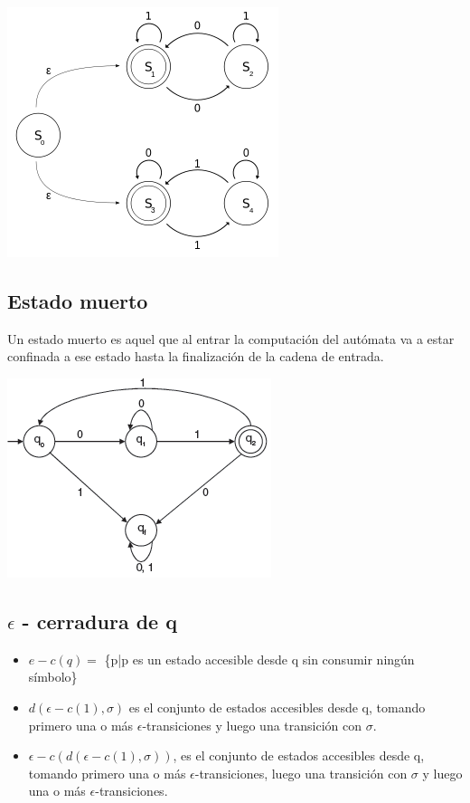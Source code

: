 \documentclass[a4paper,9pt]{extarticle}
\newenvironment{Figure}
  {\par\medskip\noindent\minipage{\linewidth}}
  {\endminipage\par\medskip}
\begin{document}
\begin{multicols*}{2}
\begin{Figure}
 \centering
 \includegraphics[scale=0.5]{AFNE}
\end{Figure}

\subsection{Estado muerto}
Un estado muerto es aquel que al entrar la computación del autómata va a estar confinada a ese estado hasta la finalización de la cadena de entrada.

\begin{Figure}
 \centering
 \includegraphics[scale=0.7]{dead_state}
\end{Figure}

\subsection{$\epsilon$ - cerradura de q}

\begin{itemize}
\item $e-c(q)=$ \{p|p es un estado accesible desde q sin consumir ningún símbolo\}
\item $d(\epsilon - c(1), \sigma)$ es el conjunto de estados accesibles desde q, tomando primero una o más $\epsilon$-transiciones y luego una transición con $\sigma$.
\item $\epsilon - c(d(\epsilon - c(1), \sigma))$, es el conjunto de estados accesibles desde q, tomando primero una o más $\epsilon$-transiciones, luego una transición con $\sigma$ y luego una o más $\epsilon$-transiciones.
\end{itemize}



\end{multicols*}
\end{document}
